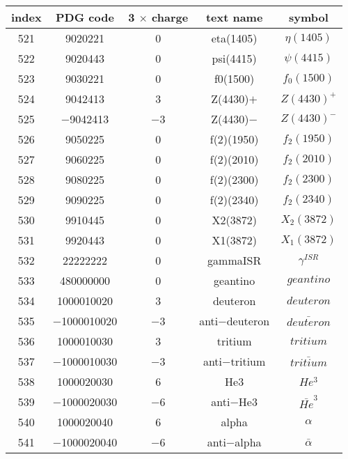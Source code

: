 \documentclass{article}
\begin{document}
\clearpage

\begin{table}[!htbp]
\centering
\begin{tabular}{|c|c|c|c|c|}
\hline
index & PDG code & 3 $\times$ charge & text name & symbol \\
\hline
521 & 9020221 & 0 & eta(1405) & $\eta(1405)$ \\
\hline
522 & 9020443 & 0 & psi(4415) & $\psi(4415)$ \\
\hline
523 & 9030221 & 0 & f\underline{\hspace{0.6em}}0(1500) & $f_{0}(1500)$ \\
\hline
524 & 9042413 & 3 & Z(4430)$+$ & $Z(4430)^{+}$ \\
\hline
525 & $-$9042413 & $-$3 & Z(4430)$-$ & $Z(4430)^{-}$ \\
\hline
526 & 9050225 & 0 & f(2)(1950) & $f_{2}(1950)$ \\
\hline
527 & 9060225 & 0 & f(2)(2010) & $f_{2}(2010)$ \\
\hline
528 & 9080225 & 0 & f(2)(2300) & $f_{2}(2300)$ \\
\hline
529 & 9090225 & 0 & f(2)(2340) & $f_{2}(2340)$ \\
\hline
530 & 9910445 & 0 & X\underline{\hspace{0.6em}}2(3872) & $X_{2}(3872)$ \\
\hline
531 & 9920443 & 0 & X\underline{\hspace{0.6em}}1(3872) & $X_{1}(3872)$ \\
\hline
532 & 22222222 & 0 & gammaISR & $\gamma^{ISR}$ \\
\hline
533 & 480000000 & 0 & geantino & $geantino$ \\
\hline
534 & 1000010020 & 3 & deuteron & $deuteron$ \\
\hline
535 & $-$1000010020 & $-$3 & anti$-$deuteron & $\bar{deuteron}$ \\
\hline
536 & 1000010030 & 3 & tritium & $tritium$ \\
\hline
537 & $-$1000010030 & $-$3 & anti$-$tritium & $\bar{tritium}$ \\
\hline
538 & 1000020030 & 6 & He3 & $He^{3}$ \\
\hline
539 & $-$1000020030 & $-$6 & anti$-$He3 & $\bar{He}^{3}$ \\
\hline
540 & 1000020040 & 6 & alpha & $\alpha$ \\
\hline
541 & $-$1000020040 & $-$6 & anti$-$alpha & $\bar{\alpha}$ \\
\hline
\end{tabular}
\end{table}

\clearpage
\end{document}
